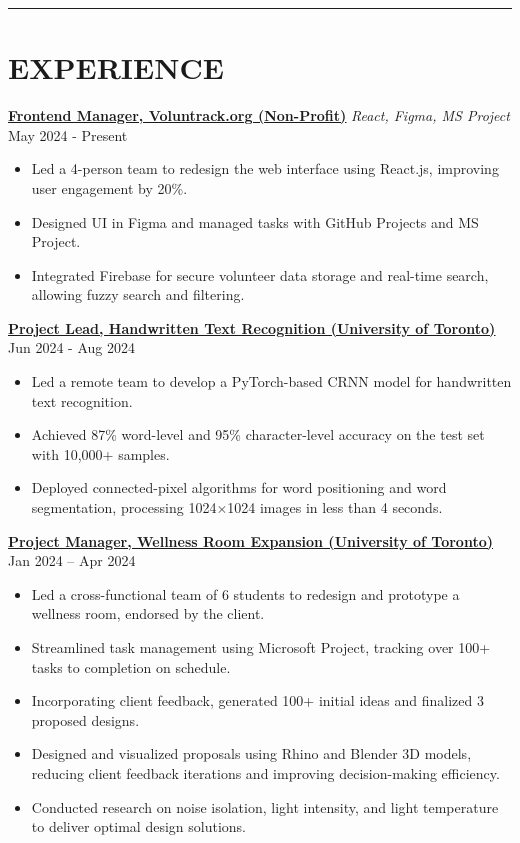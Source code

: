 \documentclass[a4paper,10pt]{article}
\begin{document}
\noindent\rule{\linewidth}{1pt}

\section*{\textbf{EXPERIENCE}}

\noindent\href{https://github.com/VolunTrack/Web}{\uline{
\textbf{Frontend Manager, Voluntrack.org (Non-Profit)}}} \textbar{} \textit{React, Figma, MS Project} \hfill May 2024 - Present
\begin{itemize}[leftmargin=0.2in]
    \item Led a 4-person team to redesign the web interface using React.js, improving user engagement by 20\%.
    \item Designed UI in Figma and managed tasks with GitHub Projects and MS Project.
    \item Integrated Firebase for secure volunteer data storage and real-time search, allowing fuzzy search and filtering.
\end{itemize}

\vspace{0.3cm}
\noindent\href{https://github.com/Ken-2511/HandwritingRecognition}{\uline{
\textbf{Project Lead, Handwritten Text Recognition (University of Toronto)}}} \hfill Jun 2024 - Aug 2024
\begin{itemize}[leftmargin=0.2in]
    \item Led a remote team to develop a PyTorch-based CRNN model for handwritten text recognition.
    \item Achieved 87\% word-level and 95\% character-level accuracy on the test set with 10,000+ samples.
    \item Deployed connected-pixel algorithms for word positioning and word segmentation, processing 1024$\times$1024 images in less than 4 seconds.
\end{itemize}

\vspace{0.3cm}
\noindent\href{https://github.com/Ken-2511/wellness-room-expansion}{\uline{
\textbf{Project Manager, Wellness Room Expansion (University of Toronto)}}} \hfill Jan 2024 -- Apr 2024
\begin{itemize}[leftmargin=0.2in]
    \item Led a cross-functional team of 6 students to redesign and prototype a wellness room, endorsed by the client.
    \item Streamlined task management using Microsoft Project, tracking over 100+ tasks to completion on schedule.
    \item Incorporating client feedback, generated 100+ initial ideas and finalized 3 proposed designs.
    \item Designed and visualized proposals using Rhino and Blender 3D models, reducing client feedback iterations and improving decision-making efficiency.
    \item Conducted research on noise isolation, light intensity, and light temperature to deliver optimal design solutions.
\end{itemize}
\end{document}
